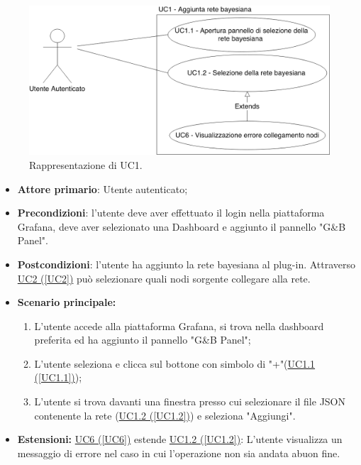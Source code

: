 \begin{figure}[H]
	\begin{center}
		\includegraphics[scale=0.3]{./images/UC1.png}
		 \caption{Rappresentazione di UC1.}	
	\end{center}
\end{figure}
\begin{itemize}
	\item \textbf{Attore primario}: Utente autenticato;
	\item \textbf{Precondizioni}: l'utente deve aver effettuato il login nella piattaforma Grafana, deve aver selezionato una Dashboard e aggiunto il pannello "G\&B Panel".
	\item \textbf{Postcondizioni}: l'utente ha aggiunto la rete bayesiana al plug-in. Attraverso \hyperref[UC2]{UC2 (\ref*{UC2})} può selezionare quali nodi sorgente collegare alla rete.
	\item \textbf{Scenario principale:}
	\begin{enumerate}
		\item L'utente accede alla piattaforma Grafana, si trova nella dashboard preferita ed ha aggiunto il pannello "G\&B Panel";
		\item L'utente seleziona e clicca sul bottone con simbolo di "+"(\hyperref[UC1.1]{UC1.1 (\ref*{UC1.1})});
		\item L'utente si trova davanti una finestra presso cui selezionare il file JSON contenente la rete (\hyperref[UC1.2]{UC1.2 (\ref*{UC1.2})}) e seleziona "Aggiungi".
	\end{enumerate}
	\item \textbf{Estensioni:} \hyperref[UC6]{UC6 (\ref*{UC6})} estende \hyperref[UC1.2]{UC1.2 (\ref*{UC1.2})}: L'utente visualizza un messaggio di errore nel caso in cui l'operazione non sia andata  abuon fine.
\end{itemize}

